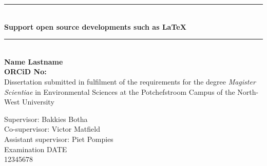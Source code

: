 
\begin{titlepage}


\newcommand{\HRule}{\rule{\linewidth}{0.0mm}}
\center %

\HRule \\[0.5cm]
{ \Huge \bfseries Support open source developments such
as \LaTeX}\\[0.2cm] 
\HRule \\[1.0cm]

{\huge \bfseries Name Lastname}\\
{\huge \bfseries ORCiD No:} \\[2.5cm]

{\LARGE Dissertation submitted in fulfilment of the requirements for
the degree {\color{cyan!85} \textit{Magister Scientiae}} in
{\color{cyan!85} {Environmental Sciences}} at the Potchefstroom Campus
of the North-West University}\\[1.5cm]

\raggedright 
{\LARGE Supervisor: \hspace{25mm} Bakkies Botha \\
Co-supervisor: \hspace{16.5mm} Victor Matfield \\[0.2cm]
Assistant supervisor: \hspace{1.5mm} Piet Pompies}\\[1.5cm]

\LARGE Examination DATE\\
\LARGE 12345678\\

\vspace*{\fill}
\noindent
\begin{center}
\end{center}

\end{titlepage}
\restoregeometry
